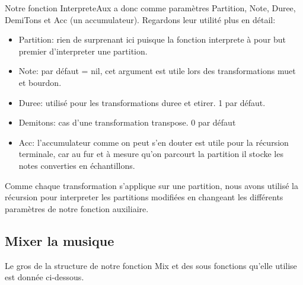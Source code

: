 \documentclass[a4paper,12pt]{report}
\begin{document}
Notre fonction InterpreteAux a donc comme paramètres Partition, Note, Duree, DemiTons et Acc (un accumulateur). Regardons leur utilité plus en détail:
\begin{itemize}
\item Partition: rien de surprenant ici puisque la fonction interprete à pour but premier d'interpreter une partition. 
\item Note: par défaut = nil, cet argument est utile lors des transformations muet et bourdon.
\item Duree: utilisé pour les transformations duree et etirer. 1 par défaut.
\item Demitons: cas d'une transformation transpose. 0 par défaut
\item Acc: l'accumulateur comme on peut s'en douter est utile pour la récursion terminale, car au fur et à mesure qu'on parcourt la partition il stocke les notes converties en échantillons. 
\end{itemize}


Comme chaque transformation s'applique sur une partition, nous avons utilisé la récursion pour interpreter les partitions modifiées en changeant les différents paramètres de notre fonction auxiliaire. 


\subsection*{Mixer la musique}
Le gros de la structure de notre fonction Mix et des sous fonctions qu'elle utilise est donnée ci-dessous.
\end{document}

